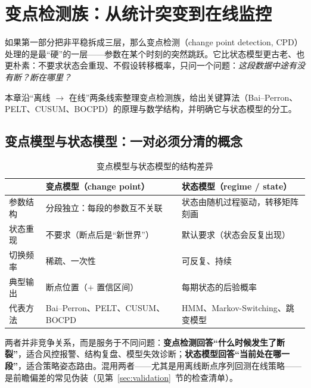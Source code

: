 
\section{变点检测族：从统计突变到在线监控}

如果第一部分把非平稳拆成三层，那么变点检测（change point detection, CPD）处理的是最“硬”的一层——参数在某个时刻的突然跳跃。它比状态模型更古老、也更朴素：不要求状态会重现、不假设转移概率，只问一个问题：\emph{这段数据中途有没有断？断在哪里？}

本章沿“离线 $\to$ 在线”两条线索整理变点检测族，给出关键算法（Bai--Perron、PELT、CUSUM、BOCPD）的原理与数学结构，并明确它与状态模型的分工。

\subsection{变点模型与状态模型：一对必须分清的概念}

\begin{table}[htbp]
\centering
\footnotesize
\begin{tabular}{>{\raggedright\arraybackslash}p{2.4cm}>{\raggedright\arraybackslash}p{4.7cm}>{\raggedright\arraybackslash}p{4.7cm}}
\toprule
& \textbf{变点模型（change point）} & \textbf{状态模型（regime / state）} \\
\midrule
参数结构 & 分段独立：每段的参数互不关联 & 状态由随机过程驱动，转移矩阵刻画 \\
状态重现 & 不要求（断点后是“新世界”） & 默认要求（状态会反复出现） \\
切换频率 & 稀疏、一次性 & 可反复、持续 \\
典型输出 & 断点位置（$+$ 置信区间） & 每期状态的后验概率 \\
代表方法 & Bai--Perron、PELT、CUSUM、BOCPD & HMM、Markov-Switching、跳变模型 \\
\bottomrule
\end{tabular}
\caption{变点模型与状态模型的结构差异}
\label{tab:cp-vs-state}
\end{table}

两者并非竞争关系，而是服务于不同问题：\textbf{变点检测回答“什么时候发生了断裂”}，适合风控报警、结构复盘、模型失效诊断；\textbf{状态模型回答“当前处在哪一段”}，适合策略姿态路由。混用两者——尤其是用离线断点序列回测在线策略——是前瞻偏差的常见伪装（见第~\ref{sec:validation}~节的检查清单）。

